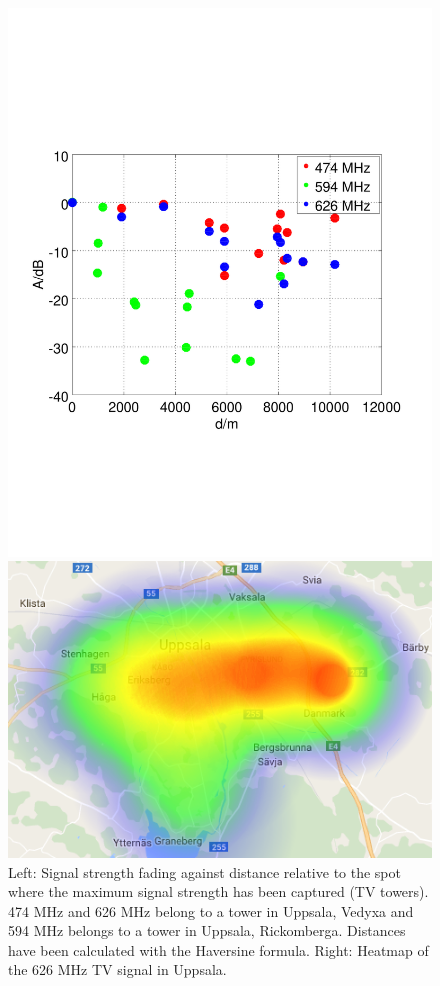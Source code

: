 \begin{figure}[h]
	\centering
	\begin{minipage}{0.49\columnwidth}
	\includegraphics[width=\columnwidth]{./fig/haversine}
	\end{minipage}
	\hfill
	\begin{minipage}{0.49\columnwidth}
	\includegraphics[width=\columnwidth]{./fig/heatmap_626mhz}
	\end{minipage}
	\caption{Left: Signal strength fading against distance relative
to the spot where the maximum signal strength has been captured (TV
towers). 474 MHz and 626 MHz belong to a tower in Uppsala, Vedyxa and
594 MHz belongs to a tower in Uppsala, Rickomberga. Distances have been
calculated with the Haversine formula. Right: Heatmap of the 626 MHz TV
signal in Uppsala.}
 

\end{figure}

